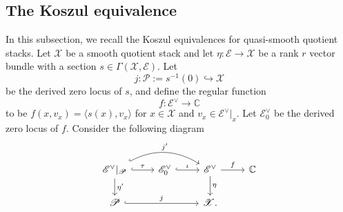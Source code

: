 \documentclass [11pt,oneside,a4paper,mathscr]{amsart}
\theoremstyle{definition}
\newcommand{\X}{\mathscr{X}}
\begin{document}
\subsection{The Koszul equivalence}\label{subsectionKoszul}
In this subsection, we recall the Koszul equivalences for quasi-smooth 
quotient stacks. 
Let $\mathscr{X}$ be a smooth quotient stack
and let $\eta\colon \mathscr{E}\to \mathscr{X}$ be a rank $r$ vector bundle with a section $s\in \Gamma(\X, \mathscr{E})$. 
Let  
\begin{equation}\label{def:K}
j\colon\mathscr{P}:=s^{-1}(0)\hookrightarrow \X
\end{equation}
be the derived zero locus of $s$, and define 
the regular function 
\begin{equation}\label{deffunctionf}
f\colon \mathscr{E}^{\vee}\to \mathbb{C}
\end{equation}
to be $f(x, v_x)=\langle s(x), v_x\rangle$ for $x\in \X$ and $v_x\in \mathscr{E}^\vee|_x$.
Let $\mathscr{E}_0^{\vee}$ be the derived zero locus of $f$. Consider 
the following diagram 
\begin{equation}\label{diagmapskoszul}
    \begin{tikzcd}
        \mathscr{E}^{\vee}|_{\mathscr{P}} \arrow[d, "\eta'"] \arrow[rr, bend left, hook, "j'"] \arrow[r, hook, "\tau"]  & \mathscr{E}_0^{\vee} \arrow[r, hook, "\iota"] & \mathscr{E}^{\vee} 
   \arrow[r, "f"] \arrow[d, "\eta"] & \mathbb{C} \\
    \mathscr{P} \arrow[rr, hook, "j"] & & \X.
    \end{tikzcd}
\end{equation}
\end{document}
